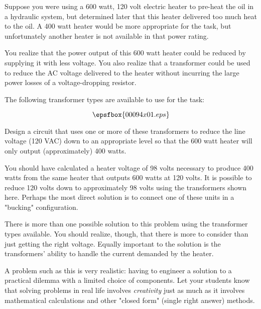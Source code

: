 

Suppose you were using a 600 watt, 120 volt electric heater to pre-heat the oil in a hydraulic system, but determined later that this heater delivered too much heat to the oil.  A 400 watt heater would be more appropriate for the task, but unfortunately another heater is not available in that power rating.

You realize that the power output of this 600 watt heater could be reduced by supplying it with less voltage.  You also realize that a transformer could be used to reduce the AC voltage delivered to the heater without incurring the large power losses of a voltage-dropping resistor.

The following transformer types are available to use for the task:

$$\epsfbox{00094x01.eps}$$

Design a circuit that uses one or more of these transformers to reduce the line voltage (120 VAC) down to an appropriate level so that the 600 watt heater will only output (approximately) 400 watts.







You should have calculated a heater voltage of 98 volts necessary to produce 400 watts from the same heater that outputs 600 watts at 120 volts.  It is possible to reduce 120 volts down to approximately 98 volts using the transformers shown here.  Perhaps the most direct solution is to connect one of these units in a "bucking" configuration.

There is more than one possible solution to this problem using the transformer types available.  You should realize, though, that there is more to consider than just getting the right voltage.  Equally important to the solution is the transformers' ability to handle the current demanded by the heater.







A problem such as this is very realistic: having to engineer a solution to a practical dilemma with a limited choice of components.  Let your students know that solving problems in real life involves {\it creativity} just as much as it involves mathematical calculations and other "closed form" (single right answer) methods.




